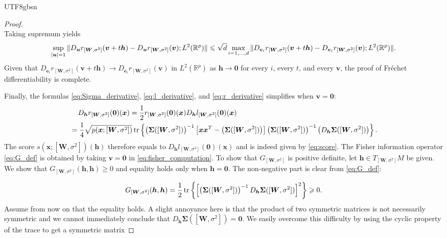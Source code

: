 \documentclass[12pt]{report}
\newcommand\tab[1][1cm]{\hspace*{#1}}
\newcommand{\bracket}[1]{\left ( #1 \right )}
\newcommand{\curly}[1]{\left \{ #1 \right \} }
\newcommand{\squared}[1]{\left [ #1 \right ]}
\theoremstyle{plain}
\theoremstyle{definition}
\begin{document}
\begin{CJK*}{UTF8}{gbsn}
\begin{proof}
\begin{equation*}
\end{equation*}
Taking supremum yields
\begin{equation*}
  \sup_{\abs{\bm{u}} = 1}
  \|D_{\bm{u}}r_{[\bm{W},\sigma^2]}(\bm{v}+t\bm{h})- D_{\bm{u}}r_{[\bm{W},\sigma^2]}(\bm{v})
  ;L^2(\mathbb{R}^p)	\|  \leqslant 
  \sqrt{d} \max_{i=1, \ldots, d} \|D_{\bm{e}_i}r_{[\bm{W},\sigma^2]}(\bm{v}+t\bm{h}) - 
  D_{\bm{e}_i}r_{[\bm{W},\sigma^2]}(\bm{v});L^2(\mathbb{R}^p)	\|.
\end{equation*}
Given that $D_{\bm{e}_i}r_{[\bm{W},\sigma^2]}(\bm{v}+t\bm{h}) 
\to D_{\bm{e}_i}r_{[\bm{W},\sigma^2]}(\bm{v})$
in $L^2(\mathbb{R}^p)$
as $\bm{h} \to \bm{0}$
for every $i$, every $t$, and every $\bm{v}$,
the proof of Fréchet differentiability is complete.

Finally,
the formulas \eqref{eq:Sigma_derivative}, \eqref{eq:l_derivative},
and \eqref{eq:r_derivative}
simplifies when $\bm{v} = \bm{0}$:
\begin{equation*}
  \begin{split}
  & \tab[0.4cm] D_{\bm{h}}r_{[\bm{W},\sigma^2]}(\bm{0})(\bm{x})
  = \frac{1}{2} r_{[\bm{W},\sigma^2]}(\bm{0})(\bm{x}) D_{\bm{h}}l_{[\bm{W},\sigma^2]}(\bm{0})(\bm{x})
  \\ & = \frac{1}{4} \sqrt{p(\bm{x}; [\bm{W},\sigma^2])}
  \tr \curly{\bracket{\bm{\Sigma}([\bm{W},\sigma^2])}^{-1}
  \squared{\bm{x}\bm{x}^T - \bracket{\bm{\Sigma}([\bm{W},\sigma^2])}}
  \bracket{\bm{\Sigma}([\bm{W},\sigma^2])}^{-1} \bracket{D_{\bm{h}}\bm{\Sigma}([\bm{W},\sigma^2])}}.
  \end{split}
\end{equation*}
The score $s(\bm{x}; [\bm{W},\sigma^2])(\bm{h})$
therefore equals to $D_{\bm{h}}l_{[\bm{W},\sigma^2]}(\bm{0})(\bm{x})$
and is indeed given by \eqref{eq:score}.
The Fisher information operator \eqref{eq:G_def} is obtained 
by taking $\bm{v} = \bm{0}$ in \eqref{eq:fisher_computation}.
To show that $G_{[\bm{W},\sigma^2]}$ is positive definite,
let $\bm{h} \in T_{[\bm{W},\sigma^2]}M$ be given.
We show that $G_{[\bm{W},\sigma^2]}(\bm{h},\bm{h}) \geqslant 0$
and equality holds only when $\bm{h} = \bm{0}$.
The non-negative part is clear from \eqref{eq:G_def}:

\begin{equation*}
  G_{[\bm{W},\sigma^2]}(\bm{h},\bm{h}) = 
  \frac{1}{2}\tr \curly{ \squared{\bracket{\bm{\Sigma}([\bm{W},\sigma^2])}^{-1}
  D_{\bm{h}}\bm{\Sigma}([\bm{W},\sigma^2])}^2 } \geqslant 0.
\end{equation*}
Assume from now on that the equality holds.
A slight annoyance here is that the product of
two symmetric matrices is not necessarily symmetric
and we cannot immediately conclude that 
$D_{\bm{h}}\bm{\Sigma}([\bm{W},\sigma^2]) = \bm{0}$.
We easily overcome this difficulty 
by using the cyclic property of the trace 
to get a symmetric matrix 


\end{proof}
\end{CJK*}
\end{document}
